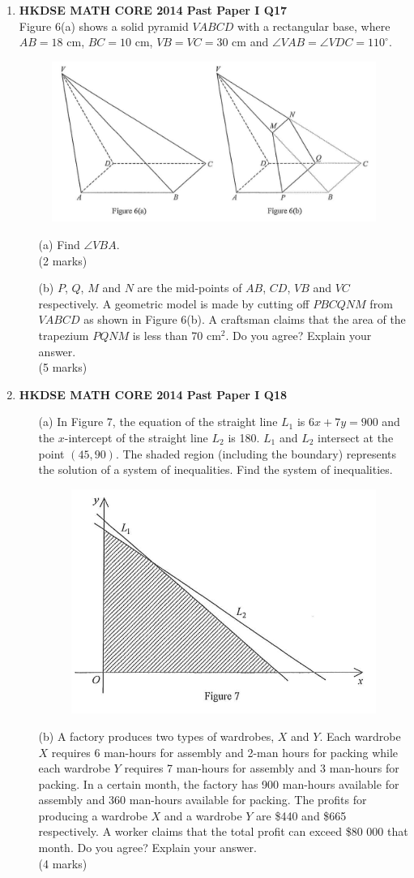 \documentclass[12pt]{article}
\begin{document}
\begin{enumerate}
	\item \textbf{HKDSE MATH CORE 2014 Past Paper I Q17}\\
	Figure 6(a) shows a solid pyramid $VABCD$ with a rectangular base, where $AB = 18$ cm, $BC = 10$ cm, $VB = VC = 30$ cm and $\angle VAB = \angle VDC = 110^\circ$.
	\begin{figure}[H]
		\centering
		\includegraphics[width = .3\linewidth]{2014Figure1.6}
	\end{figure}
	\begin{enumerate}
		\item[(a)] Find $\angle VBA$. \\(2 marks)
		\item[(b)] $P$, $Q$, $M$ and $N$ are the mid-points of $AB$, $CD$, $VB$ and $VC$ respectively. A geometric model is made by cutting off $PBCQNM$ from $VABCD$ as shown in Figure 6(b). A craftsman claims that the area of the trapezium $PQNM$ is less than 70 cm$^2$. Do you agree? Explain your answer. \\(5 marks)
	\end{enumerate}

	\item \textbf{HKDSE MATH CORE 2014 Past Paper I Q18}
	\begin{enumerate}
		\item[(a)] In Figure 7, the equation of the straight line $L_1$ is $6x + 7y = 900$ and the $x$-intercept of the straight line $L_2$ is 180. $L_1$ and $L_2$ intersect at the point $(45, 90)$. The shaded region (including the boundary) represents the solution of a system of inequalities. Find the system of inequalities.											
		\begin{figure}[H]
			\centering
			\includegraphics[width = .3\linewidth]{2014Figure1.7}
		\end{figure}
		\item[(b)] A factory produces two types of wardrobes, $X$ and $Y$. Each wardrobe $X$ requires 6 man-hours for assembly and 2-man hours for packing while each wardrobe $Y$ requires 7 man-hours for assembly and 3 man-hours for packing. In a certain month, the factory has 900 man-hours available for assembly and 360 man-hours available for packing. The profits for producing a wardrobe $X$ and a wardrobe $Y$ are \$440 and \$665 respectively. A worker claims that the total profit can exceed \$80 000 that month. Do you agree? Explain your answer. \\(4 marks)
	\end{enumerate}


\end{enumerate}
\end{document}
